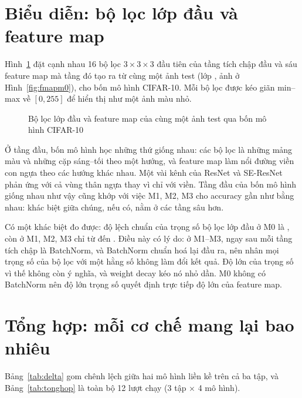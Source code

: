 \section{Biểu diễn: bộ lọc lớp đầu và feature map}

Hình~\ref{fig:bieudien} đặt cạnh nhau 16 bộ lọc $3\times3\times3$ đầu tiên của tầng tích chập đầu và sáu feature map mà tầng đó
tạo ra từ cùng một ảnh test (lớp , ảnh ở Hình~\ref{fig:fmapm0}), cho bốn mô hình CIFAR-10. Mỗi bộ lọc
được kéo giãn min--max về $[0, 255]$ để hiển thị như một ảnh màu nhỏ.

\begin{figure}[H]
  \centering
  \caption{Bộ lọc lớp đầu và feature map của cùng một ảnh test qua bốn mô hình CIFAR-10}
  \label{fig:bieudien}
\end{figure}

Ở tầng đầu, bốn mô hình học những thứ giống nhau: các bộ lọc là những mảng màu và những cặp sáng--tối theo một hướng, và
feature map làm nổi đường viền con ngựa theo các hướng khác nhau. Một vài kênh của ResNet và SE-ResNet phản ứng với cả vùng
thân ngựa thay vì chỉ với viền. Tầng đầu của bốn mô hình giống nhau như vậy cũng khớp với việc M1, M2, M3 cho accuracy gần như bằng
nhau: khác biệt giữa chúng, nếu có, nằm ở các tầng sâu hơn.

Có một khác biệt đo được: độ lệch chuẩn của trọng số bộ lọc lớp đầu ở M0 là , còn ở
M1, M2, M3 chỉ từ  đến . Điều này có lý do: ở M1--M3,
ngay sau mỗi tầng tích chập là BatchNorm, và BatchNorm chuẩn hoá lại đầu ra, nên nhân mọi trọng số của bộ lọc với một hằng số
không làm đổi kết quả. Độ lớn của trọng số vì thế không còn ý nghĩa, và weight decay kéo nó nhỏ dần. M0 không có BatchNorm nên
độ lớn trọng số quyết định trực tiếp độ lớn của feature map.

\section{Tổng hợp: mỗi cơ chế mang lại bao nhiêu}

Bảng~\ref{tab:delta} gom chênh lệch giữa hai mô hình liền kề trên cả ba tập, và Bảng~\ref{tab:tonghop} là toàn bộ 12 lượt
chạy (3 tập $\times$ 4 mô hình).

\begin{table}[H]
  \centering
  \caption{Chênh lệch chất lượng giữa hai mô hình liền kề}
  \label{tab:delta}
  \small
\end{table}

